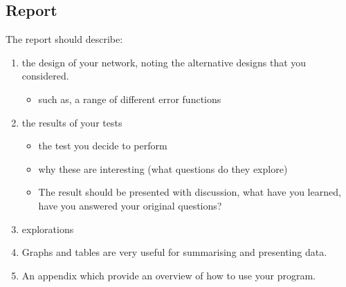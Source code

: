 \documentclass[11pt]{article}
\begin{document}
\subsection{Report}
\label{sec-6-3}
The report should describe:
\begin{enumerate}
\item the design of your network, noting the alternative designs that you considered.
\begin{itemize}
\item such as, a range of different error functions
\end{itemize}
\item the results of your tests
\begin{itemize}
\item the test you decide to perform
\item why these are interesting (what questions do they explore)
\item The result should be presented with discussion, what have you learned, have you answered your original questions?
\end{itemize}
\item explorations
\item Graphs and tables are very useful for summarising and presenting data.
\item An appendix which provide an overview of how to use your program.
\end{enumerate}
\end{document}
